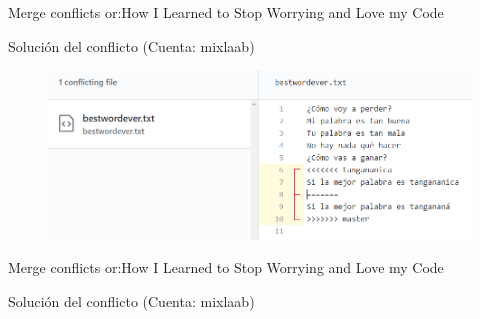 \documentclass[10pt]{beamer}
\begin{document}
\begin{frame}{Merge conflicts or:}{How I Learned to Stop Worrying and Love my Code \heartsuit}

\begin{block}{Solución del conflicto (Cuenta: mixlaab)}

\begin{figure}[h!]
\centering
\includegraphics [scale=0.3]{conflict4}
\label{fig:issues}
\end{figure}
    
\end{block}

\end{frame}
\begin{frame}{Merge conflicts or:}{How I Learned to Stop Worrying and Love my Code \heartsuit}

\begin{block}{Solución del conflicto (Cuenta: mixlaab)}

\begin{columns}[c]
\column{1.9in}

\column{1.3in}
\vspace{0.1in}
\end{columns}

    
\end{block}

\end{frame}
\end{document}
